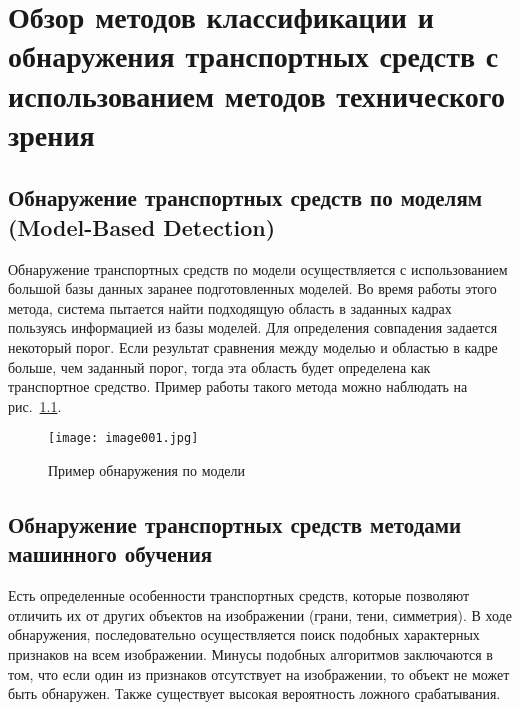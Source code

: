 \chapter{Обзор методов классификации и обнаружения транспортных средств с использованием методов технического зрения}

\section{Обнаружение транспортных средств по моделям (Model-Based Detection)}

Обнаружение транспортных средств по модели осуществляется с использованием большой базы данных заранее подготовленных моделей. Во время работы этого метода, система пытается найти подходящую область в заданных кадрах пользуясь информацией из базы моделей. Для определения совпадения задается некоторый порог. Если результат сравнения между моделью и областью в кадре больше, чем заданный порог, тогда эта область будет определена как транспортное средство. Пример работы такого метода можно наблюдать на рис.~\ref{fig:image001}.

\begin{figure}[htbp]
\centering
\texttt{[image: image001.jpg]}
\caption{Пример обнаружения по модели~\cite{one}}%
\label{fig:image001}
\end{figure}

\section{Обнаружение транспортных средств методами машинного обучения}

Есть определенные особенности транспортных средств, которые позволяют отличить их от других объектов на изображении (грани, тени, симметрия). В ходе обнаружения, последовательно осуществляется поиск подобных характерных признаков на всем изображении. Минусы подобных алгоритмов заключаются в том, что если один из признаков отсутствует на изображении, то объект не может быть обнаружен. Также существует высокая вероятность ложного срабатывания.

